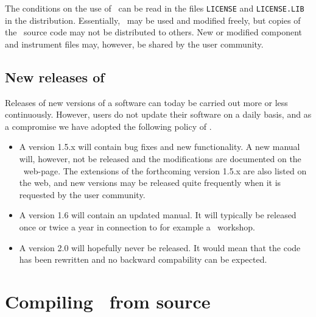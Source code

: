 The conditions on the use of \MCS\ can be read in the files
\verb+LICENSE+ and \verb+LICENSE.LIB+ in the distribution. Essentially,
\MCS\ may be used and modified freely, but copies of the \MCS\ source code 
may not be distributed to others. 
New or modified component and instrument files may, however, be shared by 
the user community.

\subsection{New releases of \MCS}
Releases of new versions of a software can today be carried out more or less
continuously. However, users do not update their software on a daily basis,
and as a compromise we have adopted the following policy of \MCS .

\begin{itemize}
\item A version 1.5.x will contain bug fixes and new functionality. A new manual
will, however, not be released and the modifications are documented on the
\MCS\ web-page. The extensions of the forthcoming version 1.5.x are also listed
on the web, and new versions may be released quite frequently when it is requested
by the user community.
\item A version 1.6 will contain an updated manual. It will typically be released
once or twice a year in connection to for example a \MCS\ workshop.
\item A version 2.0 will hopefully never be released. It would mean that the
code has been rewritten and no backward compability can be expected.
\end{itemize}

\section{Compiling \MCS\ from source}
\label{s:install}

